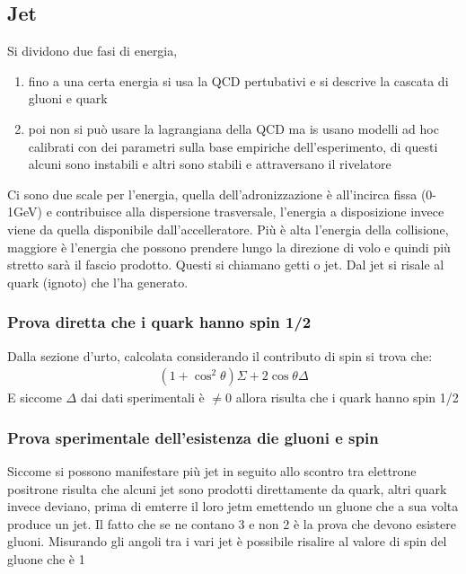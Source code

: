 \documentclass[12pt]{book}
\begin{document}
\subsection{Jet}
Si dividono due fasi di energia, 
\begin{enumerate}
	\item  fino a una certa energia si usa la QCD pertubativi e si descrive la cascata di gluoni e quark 
	\item poi non si può usare la lagrangiana della QCD ma is usano modelli ad hoc calibrati con dei parametri sulla base empiriche dell'esperimento, di questi alcuni sono instabili e altri sono stabili e attraversano il rivelatore
\end{enumerate}
Ci sono due scale per l'energia, quella dell'adronizzazione è all'incirca fissa (0-1GeV) e contribuisce alla dispersione trasversale, l'energia a disposizione invece viene da quella disponibile dall'accelleratore. Più è alta l'energia della collisione, maggiore è l'energia che possono prendere lungo la direzione di volo e quindi più stretto sarà il fascio prodotto. Questi si chiamano getti o jet. Dal jet si risale al quark (ignoto) che l'ha generato. 
\subsubsection{Prova diretta che i quark hanno spin 1/2}
Dalla sezione d'urto, calcolata considerando il contributo di spin si trova che:
\begin{gather}
	\boxed{(1+ \cos^2 \theta) \Sigma + 2 \cos \theta \Delta }
\end{gather}
E siccome $\Delta$ dai dati sperimentali è $\neq 0$ allora risulta che i quark hanno spin 1/2

\subsubsection{Prova sperimentale dell'esistenza die gluoni e spin}
Siccome si possono manifestare più jet in seguito allo scontro tra elettrone positrone risulta che alcuni jet sono prodotti direttamente da quark, altri quark invece deviano, prima di emterre il loro jetm emettendo un gluone che a sua volta produce un jet. Il fatto che se ne contano 3 e non 2 è la prova che devono esistere gluoni. Misurando gli angoli tra i vari jet è possibile risalire al valore di spin del gluone che è 1
\end{document}

